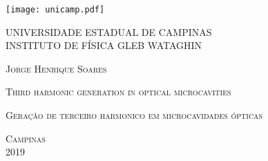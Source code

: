\thispagestyle{empty}

\begin{flushleft}
	\texttt{[image: unicamp.pdf]}
\end{flushleft}

\begin{center}
\begin{doublespacing}
{\large UNIVERSIDADE ESTADUAL DE CAMPINAS}\\
\vspace{0.5cm}
{\large INSTITUTO DE FÍSICA GLEB WATAGHIN}\\
\end{doublespacing}
\end{center}

\vspace{3cm}
\begin{center}

\begin{center}
\textsc{\large Jorge Henrique Soares}
\end{center}
\vspace{3cm}

\begin{center}
\textsc{\Large Third harmonic generation in optical microcavities}
\end{center}

\vspace*{0.3cm}

\begin{center}
\textsc{\large Geração de terceiro harmonico em microcavidades ópticas}
\end{center}

\vfill
\begin{center}
\textsc{\large Campinas\\2019}
\end{center}
\newpage

\end{center}